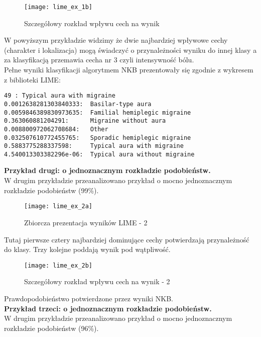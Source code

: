 \begin{figure}[H]
    \centering
    \texttt{[image: lime\_ex\_1b]}
    \caption{Szczegółowy rozkład wpływu cech na wynik}
    \label{fig:lime_ex_1b}
\end{figure}

W powyższym przykładzie widzimy że dwie najbardziej wpływowe cechy (charakter i lokalizacja) mogą świadczyć o przynależności wyniku do innej klasy a za klasyfikacją przemawia cecha nr 3 czyli intensywność bólu.\\

Pełne wyniki klasyfikacji algorytmem NKB prezentowały się zgodnie z wykresem z biblioteki LIME:

\begin{verbatim}
49 : Typical aura with migraine
0.0012638281303840333: 	Basilar-type aura
0.0059846389830973635: 	Familial hemiplegic migraine
0.363060881204291: 	    Migraine without aura
0.008800972062708684:   Other
0.032507610772455765:   Sporadic hemiplegic migraine
0.5883775288337598:     Typical aura with migraine
4.540013303382296e-06:  Typical aura without migraine
\end{verbatim}

\textbf{Przykład drugi: o jednoznacznym rozkładzie podobieństw.}\\
W drugim przykładzie przeanalizowano przykład o mocno jednoznacznym rozkładzie podobieństw (99\%).\\

\begin{figure}[H]
    \centering
    \texttt{[image: lime\_ex\_2a]}
    \caption{Zbiorcza prezentacja wyników LIME - 2}
    \label{fig:lime_ex_2a}
\end{figure}

Tutaj pierwsze cztery najbardziej dominujące cechy potwierdzają przynależność do klasy. Trzy kolejne poddają wynik pod wątpliwość.\\

\begin{figure}[H]
    \centering
    \texttt{[image: lime\_ex\_2b]}
    \caption{Szczegółowy rozkład wpływu cech na wynik - 2}
    \label{fig:lime_ex_2b}
\end{figure}

Prawdopodobieństwo potwierdzone przez wyniki NKB.\\

\textbf{Przykład trzeci: o jednoznacznym rozkładzie podobieństw.}\\
W drugim przykładzie przeanalizowano przykład o mocno jednoznacznym rozkładzie podobieństw (96\%).\\


